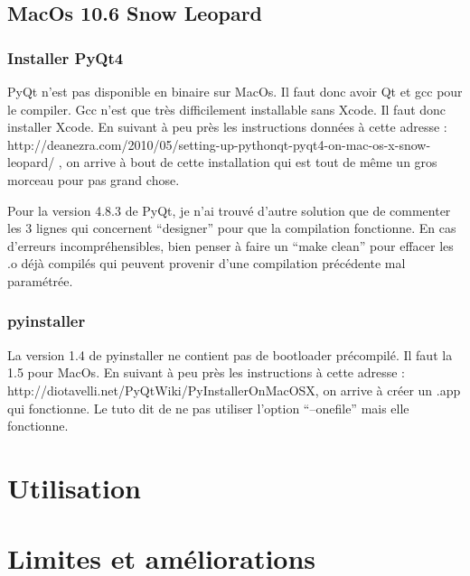 \documentclass[12pt,a4paper]{article}
\begin{document}
    \subsection{MacOs 10.6 Snow Leopard}
        \subsubsection{Installer PyQt4}
        PyQt n'est pas disponible en binaire sur MacOs. Il faut donc avoir Qt et gcc pour le compiler. 
        Gcc n'est que très difficilement installable sans Xcode. Il faut donc installer Xcode.
        En suivant à peu près les instructions données à cette adresse : \newline
        http://deanezra.com/2010/05/setting-up-pythonqt-pyqt4-on-mac-os-x-snow-leopard/\newline
        , on arrive à bout de cette installation qui est tout de même un gros morceau pour pas grand chose.
    
        Pour la version 4.8.3 de PyQt, je n'ai trouvé d'autre solution que de commenter les 3 lignes qui concernent
        ``designer'' pour que la compilation fonctionne. En cas d'erreurs incompréhensibles, bien penser à faire un ``make clean''
        pour effacer les .o déjà compilés qui peuvent provenir d'une compilation précédente mal paramétrée.

        \subsubsection{pyinstaller}
        La version 1.4 de pyinstaller ne contient pas de bootloader précompilé. Il faut la 1.5 pour MacOs.
        En suivant à peu près les instructions à cette adresse : http://diotavelli.net/PyQtWiki/PyInstallerOnMacOSX, on arrive à créer un 
        .app qui fonctionne. Le tuto dit de ne pas utiliser l'option ``--onefile'' mais elle fonctionne.

\section{Utilisation}

\section{Limites et améliorations}
\end{document}
